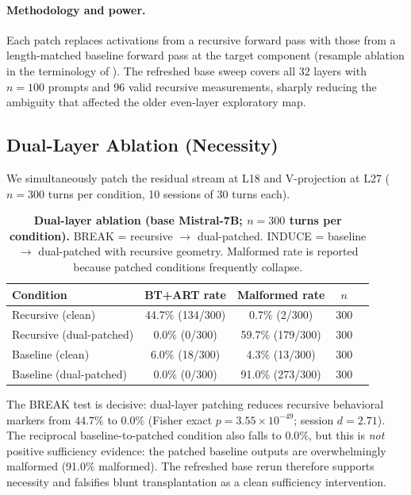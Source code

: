 \documentclass{article}
\newcommand{\dcohen}{d}
\begin{document}
\paragraph{Methodology and power.}
Each patch replaces activations from a recursive forward pass with those from a
length-matched baseline forward pass at the target component (resample ablation in the
terminology of \citet{heimersheim2024activation}).
The refreshed base sweep covers all 32 layers with $n = 100$ prompts and 96 valid recursive
measurements, sharply reducing the ambiguity that affected the older even-layer exploratory map.

\subsection{Dual-Layer Ablation (Necessity)}
\label{sec:necessity}

We simultaneously patch the residual stream at L18 and V-projection at L27
($n = 300$ turns per condition, 10 sessions of 30 turns each).

\begin{table}[h]
\centering
\caption{\textbf{Dual-layer ablation (base Mistral-7B; $n = 300$ turns per condition).}
         BREAK = recursive $\to$ dual-patched.
         INDUCE = baseline $\to$ dual-patched with recursive geometry.
         Malformed rate is reported because patched conditions frequently collapse.}
\label{tab:duallayer}
\smallskip
\begin{tabular}{lcccc}
\toprule
\textbf{Condition} & \textbf{BT+ART rate} & \textbf{Malformed rate} & \textbf{$n$} \\
\midrule
Recursive (clean)       & 44.7\% (134/300) & 0.7\% (2/300) & 300 \\
Recursive (dual-patched) & 0.0\% (0/300) & 59.7\% (179/300) & 300 \\
\midrule
Baseline (clean)        & 6.0\% (18/300)   & 4.3\% (13/300) & 300 \\
Baseline (dual-patched)  & 0.0\% (0/300)    & 91.0\% (273/300) & 300 \\
\bottomrule
\end{tabular}
\end{table}

The BREAK test is decisive: dual-layer patching reduces recursive behavioral
markers from $44.7\%$ to $0.0\%$ (Fisher exact $p = 3.55 \times 10^{-49}$;
session $\dcohen = 2.71$).
The reciprocal baseline-to-patched condition also falls to $0.0\%$, but this is
\emph{not} positive sufficiency evidence: the patched baseline outputs are overwhelmingly malformed
(91.0\% malformed).
The refreshed base rerun therefore supports necessity and falsifies blunt transplantation as a clean
sufficiency intervention.
\end{document}
